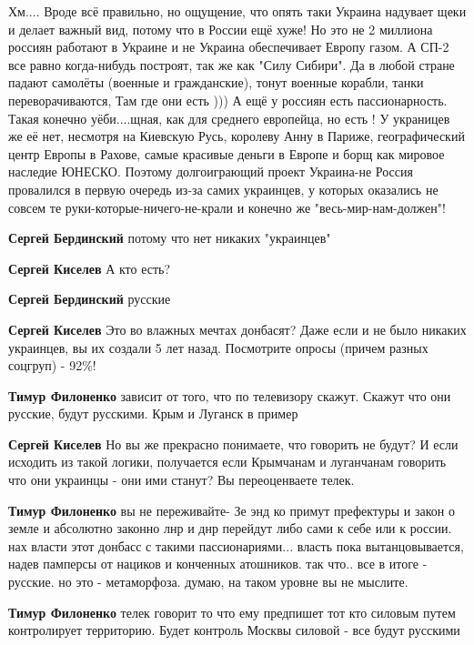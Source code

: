 \begin{itemize}
Хм.... Вроде всё правильно, но ощущение, что опять таки Украина надувает щеки и
делает важный вид, потому что в России ещё хуже! Но это не 2 миллиона россиян
работают в Украине и не Украина обеспечивает Европу газом. А СП-2 все равно
когда-нибудь построят, так же как "Силу Сибири". Да в любой стране падают
самолёты (военные и гражданские), тонут военные корабли, танки
переворачиваются, Там где они есть ))) А ещё у россиян есть пассионарность.
Такая конечно уёби....щная, как для среднего европейца, но есть ! У украницев
же её нет, несмотря на Киевскую Русь, королеву Анну в Париже, географический
центр Европы в Рахове, самые красивые деньги в Европе и борщ как мировое
наследие ЮНЕСКО. Поэтому долгоиграющий проект Украина-не Россия провалился в
первую очередь из-за самих украинцев, у которых оказались не совсем те
руки-которые-ничего-не-крали и конечно же "весь-мир-нам-должен"!

\begin{itemize} %
\textbf{Сергей Бердинский} потому что нет никаких "украинцев"

\textbf{Сергей Киселев} А кто есть?

\textbf{Сергей Бердинский} русские

\textbf{Сергей Киселев} Это во влажных мечтах донбасят? Даже если и не было никаких украинцев, вы их создали 5 лет назад. Посмотрите опросы (причем разных соцгруп) - 92\%!

\textbf{Тимур Филоненко} зависит от того, что по телевизору скажут. Скажут что они русские, будут русскими. Крым и Луганск в пример

\textbf{Сергей Киселев} Но вы же прекрасно понимаете, что говорить не будут? И если исходить из такой логики, получается если Крымчанам и луганчанам говорить что они украинцы - они ими станут? Вы переоценваете телек.

\textbf{Тимур Филоненко} вы не переживайте- Зе энд ко примут префектуры и закон о земле и абсолютно законно лнр и днр перейдут либо сами к себе или к россии. нах власти этот донбасс с такими пассионариями... власть пока вытанцовывается, надев памперсы от нациков и конченных атошников.
так что.. все в итоге - русские. но это - метаморфоза. думаю, на таком уровне вы не мыслите.

\textbf{Тимур Филоненко} телек говорит то что ему предпишет тот кто силовым путем контролирует территорию.
Будет контроль Москвы силовой - все будут русскими


\end{itemize}
\end{itemize}
